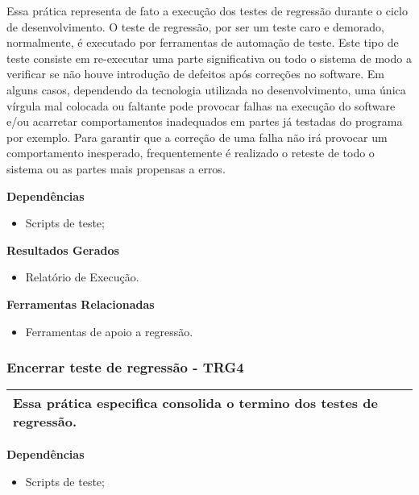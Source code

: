 Essa prática representa de fato a execução dos testes de regressão durante o ciclo de desenvolvimento. O teste de regressão, por ser um teste caro e demorado, normalmente, é executado por ferramentas de automação de teste. Este tipo de teste consiste em re-executar uma parte significativa ou todo o sistema de modo a verificar se não houve introdução de defeitos após correções no software. Em alguns casos, dependendo da tecnologia utilizada no desenvolvimento, uma única vírgula mal colocada ou faltante pode provocar falhas na execução do software e/ou acarretar comportamentos inadequados em partes já testadas do programa por exemplo. Para garantir que a correção de uma falha não irá provocar um comportamento inesperado, frequentemente é realizado o reteste de todo o sistema ou as partes mais propensas a erros.


\textbf{Dependências}
\begin{itemize}
    \item Scripts de teste;
\end{itemize}

\textbf{Resultados Gerados}
\begin{itemize}
    \item Relatório de Execução.
\end{itemize}

\textbf{Ferramentas Relacionadas}
\begin{itemize}
    \item Ferramentas de apoio a regressão.
\end{itemize}

\subsubsection{Encerrar teste de regressão - TRG4}
\label{sec:trg4}

\begin{table}[H]
\centering
\begin{tabular}{|p{130mm}|}
\hline
 Essa prática especifica consolida o termino dos testes de regressão.\\
\hline
\end{tabular}
\end{table}





\textbf{Dependências}
\begin{itemize}
    \item Scripts de teste;
\end{itemize}

